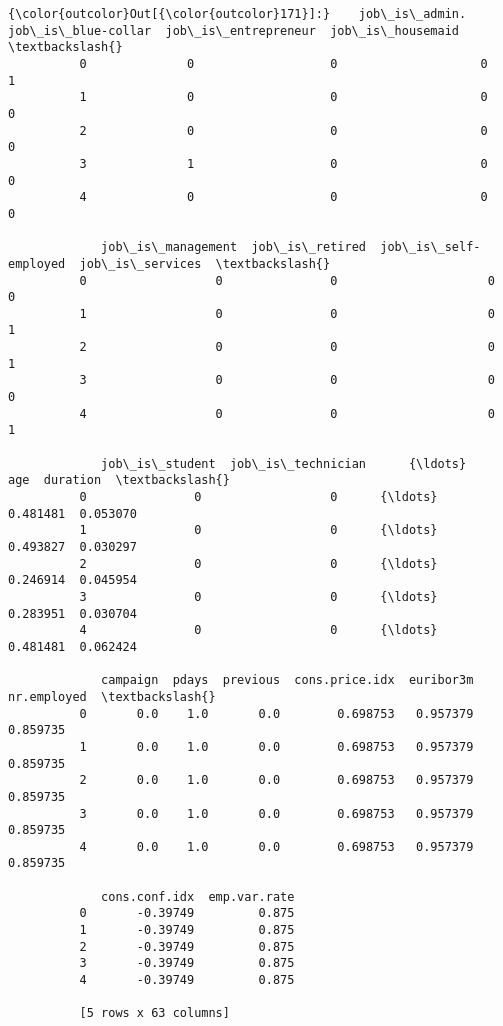 \documentclass[11pt]{article}
\begin{document}
\begin{Verbatim}[commandchars=\\\{\}]
{\color{outcolor}Out[{\color{outcolor}171}]:}    job\_is\_admin.  job\_is\_blue-collar  job\_is\_entrepreneur  job\_is\_housemaid  \textbackslash{}
          0              0                   0                    0                 1   
          1              0                   0                    0                 0   
          2              0                   0                    0                 0   
          3              1                   0                    0                 0   
          4              0                   0                    0                 0   
          
             job\_is\_management  job\_is\_retired  job\_is\_self-employed  job\_is\_services  \textbackslash{}
          0                  0               0                     0                0   
          1                  0               0                     0                1   
          2                  0               0                     0                1   
          3                  0               0                     0                0   
          4                  0               0                     0                1   
          
             job\_is\_student  job\_is\_technician      {\ldots}            age  duration  \textbackslash{}
          0               0                  0      {\ldots}       0.481481  0.053070   
          1               0                  0      {\ldots}       0.493827  0.030297   
          2               0                  0      {\ldots}       0.246914  0.045954   
          3               0                  0      {\ldots}       0.283951  0.030704   
          4               0                  0      {\ldots}       0.481481  0.062424   
          
             campaign  pdays  previous  cons.price.idx  euribor3m  nr.employed  \textbackslash{}
          0       0.0    1.0       0.0        0.698753   0.957379     0.859735   
          1       0.0    1.0       0.0        0.698753   0.957379     0.859735   
          2       0.0    1.0       0.0        0.698753   0.957379     0.859735   
          3       0.0    1.0       0.0        0.698753   0.957379     0.859735   
          4       0.0    1.0       0.0        0.698753   0.957379     0.859735   
          
             cons.conf.idx  emp.var.rate  
          0       -0.39749         0.875  
          1       -0.39749         0.875  
          2       -0.39749         0.875  
          3       -0.39749         0.875  
          4       -0.39749         0.875  
          
          [5 rows x 63 columns]
\end{Verbatim}
            
\end{document}
